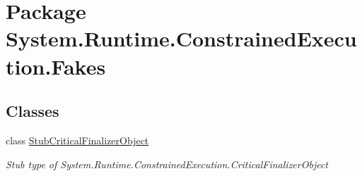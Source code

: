 \hypertarget{namespace_system_1_1_runtime_1_1_constrained_execution_1_1_fakes}{\section{Package System.\-Runtime.\-Constrained\-Execution.\-Fakes}
\label{namespace_system_1_1_runtime_1_1_constrained_execution_1_1_fakes}
}
\subsection*{Classes}
\begin{DoxyCompactItemize}
\item 
class \hyperlink{class_system_1_1_runtime_1_1_constrained_execution_1_1_fakes_1_1_stub_critical_finalizer_object}{Stub\-Critical\-Finalizer\-Object}
\begin{DoxyCompactList}\small\item\em Stub type of System.\-Runtime.\-Constrained\-Execution.\-Critical\-Finalizer\-Object\end{DoxyCompactList}\end{DoxyCompactItemize}
